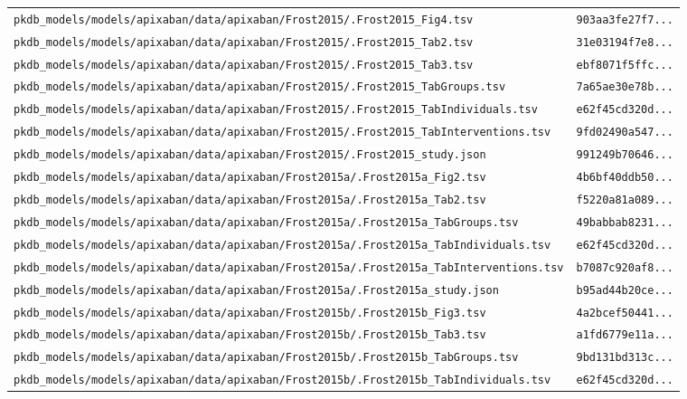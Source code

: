\begin{longtable}{ll}
\texttt{pkdb\_models/models/apixaban/data/apixaban/Frost2015/.Frost2015\_Fig4.tsv} & \texttt{903aa3fe27f7...} \\
\texttt{pkdb\_models/models/apixaban/data/apixaban/Frost2015/.Frost2015\_Tab2.tsv} & \texttt{31e03194f7e8...} \\
\texttt{pkdb\_models/models/apixaban/data/apixaban/Frost2015/.Frost2015\_Tab3.tsv} & \texttt{ebf8071f5ffc...} \\
\texttt{pkdb\_models/models/apixaban/data/apixaban/Frost2015/.Frost2015\_TabGroups.tsv} & \texttt{7a65ae30e78b...} \\
\texttt{pkdb\_models/models/apixaban/data/apixaban/Frost2015/.Frost2015\_TabIndividuals.tsv} & \texttt{e62f45cd320d...} \\
\texttt{pkdb\_models/models/apixaban/data/apixaban/Frost2015/.Frost2015\_TabInterventions.tsv} & \texttt{9fd02490a547...} \\
\texttt{pkdb\_models/models/apixaban/data/apixaban/Frost2015/.Frost2015\_study.json} & \texttt{991249b70646...} \\
\texttt{pkdb\_models/models/apixaban/data/apixaban/Frost2015a/.Frost2015a\_Fig2.tsv} & \texttt{4b6bf40ddb50...} \\
\texttt{pkdb\_models/models/apixaban/data/apixaban/Frost2015a/.Frost2015a\_Tab2.tsv} & \texttt{f5220a81a089...} \\
\texttt{pkdb\_models/models/apixaban/data/apixaban/Frost2015a/.Frost2015a\_TabGroups.tsv} & \texttt{49babbab8231...} \\
\texttt{pkdb\_models/models/apixaban/data/apixaban/Frost2015a/.Frost2015a\_TabIndividuals.tsv} & \texttt{e62f45cd320d...} \\
\texttt{pkdb\_models/models/apixaban/data/apixaban/Frost2015a/.Frost2015a\_TabInterventions.tsv} & \texttt{b7087c920af8...} \\
\texttt{pkdb\_models/models/apixaban/data/apixaban/Frost2015a/.Frost2015a\_study.json} & \texttt{b95ad44b20ce...} \\
\texttt{pkdb\_models/models/apixaban/data/apixaban/Frost2015b/.Frost2015b\_Fig3.tsv} & \texttt{4a2bcef50441...} \\
\texttt{pkdb\_models/models/apixaban/data/apixaban/Frost2015b/.Frost2015b\_Tab3.tsv} & \texttt{a1fd6779e11a...} \\
\texttt{pkdb\_models/models/apixaban/data/apixaban/Frost2015b/.Frost2015b\_TabGroups.tsv} & \texttt{9bd131bd313c...} \\
\texttt{pkdb\_models/models/apixaban/data/apixaban/Frost2015b/.Frost2015b\_TabIndividuals.tsv} & \texttt{e62f45cd320d...} \\

\end{longtable}
